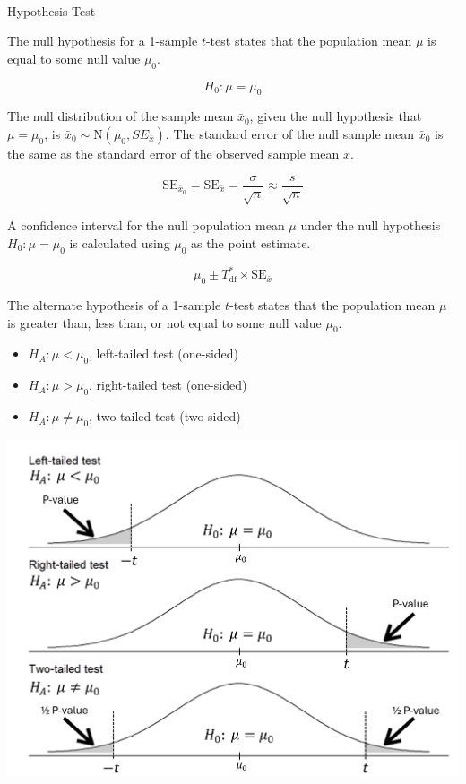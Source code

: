 \documentclass[
  letterpaper,
  DIV=11,
  numbers=noendperiod]{scrartcl}
\makeatletter
\let\oldparagraph\paragraph
\renewcommand{\paragraph}{
    \@ifstar
      \xxxParagraphStar
      \xxxParagraphNoStar
  }
\newcommand{\xxxParagraphStar}[1]{\oldparagraph*{#1}\mbox{}}
\newcommand{\xxxParagraphNoStar}[1]{\oldparagraph{#1}\mbox{}}
\makeatother
\begin{document}
\paragraph{Hypothesis Test}\label{hypothesis-test}

The null hypothesis for a 1-sample \(t\)-test states that the population
mean \(\mu\) is equal to some null value \(\mu_0\).

\[
H_0 \colon \mu=\mu_0
\]

The null distribution of the sample mean \(\bar{x}_0\), given the null
hypothesis that \(\mu=\mu_0\), is
\(\bar{x}_0 \sim \text{N}\left(\mu_0, SE_{\bar{x}}\right)\). The
standard error of the null sample mean \(\bar{x}_0\) is the same as the
standard error of the observed sample mean \(\bar{x}\).

\[
\text{SE}_{\bar{x}_0}=\text{SE}_{\bar{x}}=\frac{\sigma}{\sqrt{n}} \approx \frac{s}{\sqrt{n}}
\]

A confidence interval for the null population mean \(\mu\) under the
null hypothesis \(H_0 \colon \mu=\mu_0\) is calculated using \(\mu_0\)
as the point estimate.

\[
\mu_0 \pm T_{\text{df}}^* \times \text{SE}_{\bar{x}}
\]

The alternate hypothesis of a 1-sample \(t\)-test states that the
population mean \(\mu\) is greater than, less than, or not equal to some
null value \(\mu_0\).

\begin{itemize}
\item
  \(H_A \colon \mu < \mu_0\), left-tailed test (one-sided)
\item
  \(H_A \colon \mu > \mu_0\), right-tailed test (one-sided)
\item
  \(H_A \colon \mu \ne \mu_0\), two-tailed test (two-sided)
\end{itemize}

\includegraphics{cheatsheet_files/mediabag/one-sample-t-test.png}
\end{document}
